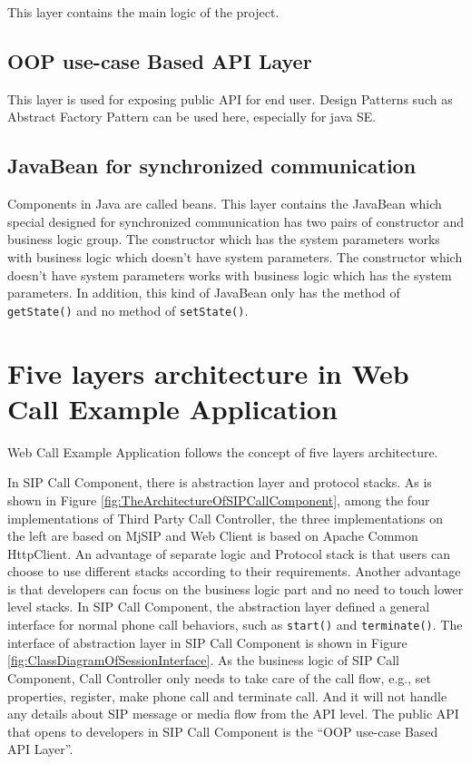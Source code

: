 This layer contains the main logic of the project.

\subsection{OOP use-case Based API Layer}

This layer is used for exposing public API for end user. Design Patterns such as Abstract Factory Pattern can be used here, especially for java SE.

\subsection{JavaBean for synchronized communication}

Components in Java are called beans. This layer contains the JavaBean which special designed for synchronized communication has two pairs of constructor and business logic group. The constructor which has the system parameters works with business logic which doesn't have system parameters. The constructor which doesn't have system parameters works with business logic which has the system parameters. In addition, this kind of JavaBean only has the method of \texttt{getState()} and no method of \texttt{setState()}. 

\section{Five layers architecture in Web Call Example Application}

Web Call Example Application follows the concept of five layers architecture. 

In SIP Call Component, there is abstraction layer and protocol stacks. As is shown in Figure \ref{fig:TheArchitectureOfSIPCallComponent}, among the four implementations of Third Party Call Controller, the three implementations on the left are based on \textsf{MjSIP} and Web Client is based on \textsf{Apache} \textsf{Common} \textsf{HttpClient}. An advantage of separate logic and Protocol stack is that users can choose to use different stacks according to their requirements. Another advantage is that developers can focus on the business logic part and no need to touch lower level stacks. In SIP Call Component, the abstraction layer defined a general interface for normal phone call behaviors, such as \texttt{start()} and \texttt{terminate()}. The interface of abstraction layer in SIP Call Component is shown in Figure \ref{fig:ClassDiagramOfSessionInterface}.  As the business logic of SIP Call Component, Call Controller only needs to take care of the call flow, e.g., set properties, register, make phone call and terminate call. And it will not handle any details about SIP message or media flow from the API level. The public API that opens to developers in SIP Call Component is the ``OOP use-case Based API Layer''. 


